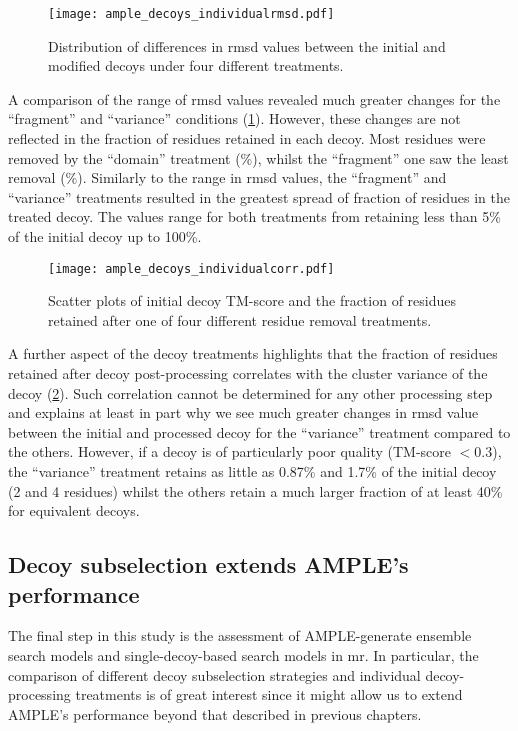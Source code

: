 \begin{figure}[H]
	\centering
	\texttt{[image: ample\_decoys\_individualrmsd.pdf]}
        \caption[Difference in RMSD for individually processed decoys]{Distribution of differences in \gls{rmsd} values between the initial and modified decoys under four different treatments.}
	\label{fig:ample_decoys_individualrmsd}
\end{figure}

A comparison of the range of \gls{rmsd} values revealed much greater changes for the ``fragment'' and ``variance'' conditions (\cref{fig:ample_decoys_individualrmsd}). However, these changes are not reflected in the fraction of residues retained in each decoy. Most residues were removed by the ``domain'' treatment (\%), whilst the ``fragment'' one saw the least removal (\%). Similarly to the range in \gls{rmsd} values, the ``fragment'' and ``variance'' treatments resulted in the greatest spread of fraction of residues in the treated decoy. The values range for both treatments from retaining less than 5\% of the initial decoy up to 100\%.

\begin{figure}[H]
        \centering
        \texttt{[image: ample\_decoys\_individualcorr.pdf]}
        \caption[Relationship between decoy quality and fraction of residues retained]{Scatter plots of initial decoy TM-score and the fraction of residues retained after one of four different residue removal treatments.}
        \label{fig:ample_decoys_individualcorr}
\end{figure}

A further aspect of the decoy treatments highlights that the fraction of residues retained after decoy post-processing correlates with the cluster variance of the decoy (\cref{fig:ample_decoys_individualcorr}). Such correlation cannot be determined for any other processing step and explains at least in part why we see much greater changes in \gls{rmsd} value between the initial and processed decoy for the ``variance'' treatment compared to the others. However, if a decoy is of particularly poor quality (TM-score $<0.3$), the ``variance'' treatment retains as little as 0.87\% and 1.7\% of the initial decoy (2 and 4 residues) whilst the others retain a much larger fraction of at least 40\% for equivalent decoys.

\subsection{Decoy subselection extends AMPLE's performance}
The final step in this study is the assessment of AMPLE-generate ensemble search models and single-decoy-based search models in \gls{mr}. In particular, the comparison of different decoy subselection strategies and individual decoy-processing treatments is of great interest since it might allow us to extend AMPLE's performance beyond that described in previous chapters.

